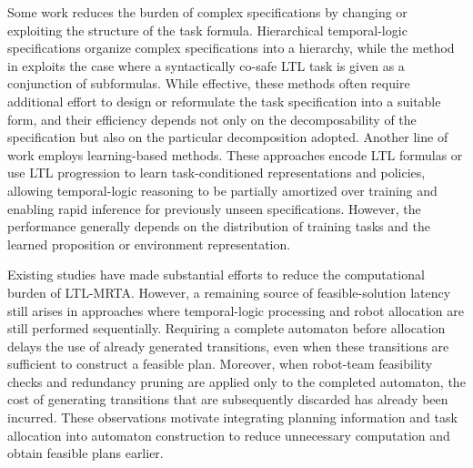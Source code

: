 \documentclass[lettersize,journal]{IEEEtran}
\theoremstyle{italiclemma}
\theoremstyle{italiclemma}
\theoremstyle{definition}
\begin{document}
Some work reduces the burden of complex specifications by changing or exploiting the structure of the task formula\cite{luo2024decomposition,2025Nl2Hltl2Plan, Finkbeiner2022}. Hierarchical temporal-logic specifications \cite{luo2025simultaneous} organize complex specifications into a hierarchy, while the method in \cite{research0337} exploits the case where a syntactically co-safe LTL task is given as a conjunction of subformulas. While effective, these methods often require additional effort to design or reformulate the task specification into a suitable form, and their efficiency depends not only on the decomposability of the specification but also on the particular decomposition adopted\cite{Specification}. Another line of work employs learning-based methods\cite{vaezipoor2021ltl2action, 9341325, 9803859, 10167731, 11570807}. These approaches encode LTL formulas or use LTL progression to learn task-conditioned representations and policies, allowing temporal-logic reasoning to be partially amortized over training and enabling rapid inference for previously unseen specifications. However, the performance generally depends on the distribution of training tasks and the learned proposition or environment representation.

Existing studies have made substantial efforts to reduce the computational burden of LTL-MRTA. However, a remaining source of feasible-solution latency still arises in approaches where temporal-logic processing and robot allocation are still performed sequentially. Requiring a complete automaton before allocation delays the use of already generated transitions, even when these transitions are sufficient to construct a feasible plan. Moreover, when robot-team feasibility checks and redundancy pruning are applied only to the completed automaton, the cost of generating transitions that are subsequently discarded has already been incurred. These observations motivate integrating planning information and task allocation into automaton construction to reduce unnecessary computation and obtain feasible plans earlier.




\end{document}

